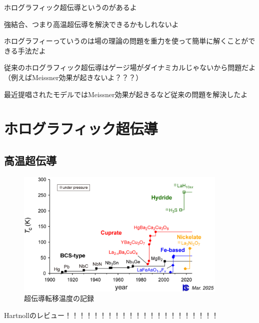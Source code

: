 \documentclass[b5paper,11pt,dvipdfmx]{jsarticle}
\numberwithin{equation}{section}
\theoremstyle{definition}
\begin{document}
ホログラフィック超伝導というのがあるよ

強結合、つまり高温超伝導を解決できるかもしれないよ

ホログラフィーっていうのは場の理論の問題を重力を使って簡単に解くことができる手法だよ

従来のホログラフィック超伝導はゲージ場がダイナミカルじゃないから問題だよ
（例えばMeissner効果が起きないよ？？？）

最近提唱されたモデルではMeissner効果が起きるなど従来の問題を解決したよ





















\section{ホログラフィック超伝導}

\subsection{高温超伝導}
\begin{figure}[t]
    \centering
    \includegraphics[width=0.9\textwidth]{tc-history_2025.jpg}
    \caption{超伝導転移温度の記録}
    \label{fig:tc-history}
\end{figure}

Hartnollのレビュー！！！！！！！！！！！！！！！！！！！！！！
\end{document}

